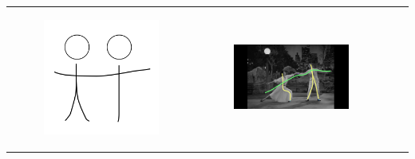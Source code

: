 \begin{table}[!htb]
\begin{tabular}{cccc}
\begin{subfigure}{0.2\textwidth}\centering\includegraphics[scale=0.1]{img/07keyframe}\end{subfigure}&
\begin{subfigure}{0.23\textwidth}\centering\includegraphics[scale=0.08]{img/keyframe_case_7_(4)}\end{subfigure}&

\end{tabular}
\end{table}
